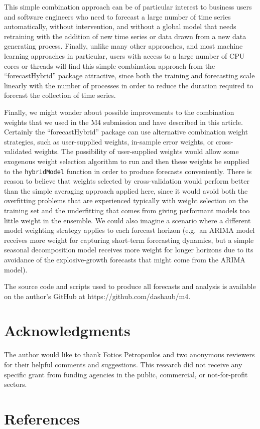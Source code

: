 \documentclass[11pt,3p,review,authoryear]{elsarticle}
\begin{document}
This simple combination approach can be of particular interest to business users and software engineers who need to forecast a large number of time series automatically, without intervention, and without a global model that needs retraining with the addition of new time series or data drawn from a new data generating process. Finally, unlike many other approaches, and most machine learning approaches in particular, users with access to a large number of CPU cores or threads will find this simple combination approach from the ``forecastHybrid'' package attractive, since both the training and forecasting scale linearly with the number of processes in order to reduce the duration required to forecast the collection of time series.

Finally, we might wonder about possible improvements to the combination weights that we used in the M4 submission and have described in this article. Certainly the ``forecastHybrid'' package can use
alternative combination weight strategies, such as user-supplied weights, in-sample error weights, or
cross-validated weights. The possibility of user-supplied weights would allow some exogenous weight selection algorithm to run and then these weights be supplied to the \texttt{hybridModel} function in order to produce forecasts conveniently. There is reason to believe that weights selected by cross-validation would perform better than the simple averaging approach applied here, since it would avoid both the overfitting problems that are experienced typically with weight selection on the training set and the underfitting that comes from giving performant models too little weight in the ensemble. We could also imagine a scenario where a different model weighting strategy applies to each forecast horizon (e.g.\ an ARIMA model receives more weight for capturing short-term forecasting dynamics, but a simple seasonal decomposition model receives more weight for longer horizons due to its avoidance of the explosive-growth forecasts that might come from the ARIMA model).

The source code and scripts used to produce all forecasts and analysis is available on the author's GitHub at https://github.com/dashaub/m4.

\section*{Acknowledgments}

The author would like to thank Fotios Petropoulos and two anonymous reviewers for their helpful comments and suggestions. This research did not receive any specific grant from funding agencies in the public, commercial, or not-for-profit sectors.


\section{References}

\end{document}
